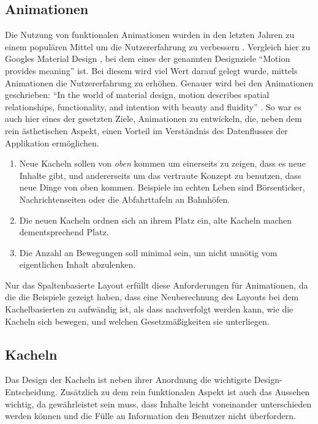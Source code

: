 \documentclass[12pt,twoside]{book}
\begin{document}
\subsection{Animationen}

Die Nutzung von funktionalen Animationen wurden in den letzten Jahren zu einem populären Mittel um die Nutzererfahrung zu verbessern \cite{functionalanimations}. Vergleich hier zu Googles Material Design \cite{materialdesign}, bei dem eines der genannten Designziele ``Motion provides meaning'' ist. Bei diesem wird viel Wert darauf gelegt wurde, mittels Animationen die Nutzererfahrung zu erhöhen. Genauer wird bei den Animationen geschrieben: ``In the world of material design, motion describes spatial relationships, functionality, and intention with beauty and fluidity'' \cite{materialdesign}.
So war es auch hier eines der gesetzten Ziele, Animationen zu entwickeln, die, neben dem rein ästhetischen Aspekt, einen Vorteil im Verständnis des Datenflusses der Applikation ermöglichen.

\begin{enumerate}
  \item Neue Kacheln sollen von \textit{oben} kommen um einerseits zu zeigen, dass es neue Inhalte gibt, und andererseits um das vertraute Konzept zu benutzen, dass neue Dinge von oben kommen. Beispiele im echten Leben sind Börsenticker, Nachrichtenseiten oder die Abfahrttafeln an Bahnhöfen.

  \item Die neuen Kacheln ordnen sich an ihrem Platz ein, alte Kacheln machen dementsprechend Platz.
  \item Die Anzahl an Bewegungen soll minimal sein, um nicht unnötig vom eigentlichen Inhalt abzulenken.
\end{enumerate}

Nur das Spaltenbasierte Layout erfüllt diese Anforderungen für Animationen, da die die Beispiele gezeigt haben, dass eine Neuberechnung des Layouts bei dem Kachelbasierten zu aufwändig ist, als dass nachverfolgt werden kann, wie die Kacheln sich bewegen, und welchen Gesetzmäßigkeiten sie unterliegen.

\subsection{Kacheln}\label{sec:tiles}

Das Design der Kacheln ist neben ihrer Anordnung die wichtigste Design-Entscheidung. Zusätzlich zu dem rein funktionalen Aspekt ist auch das Aussehen wichtig, da gewährleistet sein muss, dass Inhalte leicht voneinander unterschieden werden können und die Fülle an Information den Benutzer nicht überfordern.
\end{document}
